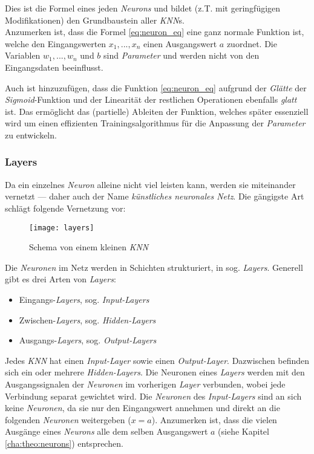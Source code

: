 Dies ist die Formel eines jeden \textit{Neurons} und bildet (z.T. mit geringfügigen Modifikationen) den Grundbaustein aller \textit{KNN}s.\\

Anzumerken ist, dass die Formel \ref{eq:neuron_eq} eine ganz normale Funktion ist, welche den Eingangswerten $x_1,...,x_n$ einen Ausgangswert $a$ zuordnet. Die Variablen $w_1,...,w_n$ und $b$ sind \textit{Parameter} und werden nicht von den Eingangsdaten beeinflusst.

Auch ist hinzuzufügen, dass die Funktion \ref{eq:neuron_eq} aufgrund der \textit{Glätte} der \textit{Sigmoid}-Funktion und der Linearität der restlichen Operationen ebenfalls \textit{glatt} ist. Das ermöglicht das (partielle) Ableiten der Funktion, welches später essenziell wird um einen effizienten Trainingsalgorithmus für die Anpassung der \textit{Parameter} zu entwickeln.

\newpage

\subsubsection{Layers}\label{cha:theo:layers}

Da ein einzelnes \textit{Neuron} alleine nicht viel leisten kann, werden sie miteinander vernetzt --- daher auch der Name \textit{künstliches neuronales Netz}. Die gängigste Art schlägt folgende Vernetzung vor:

\begin{figure}[h]
	\centering
	\texttt{[image: layers]}
	\caption[Schema von kleinem \textit{KNN}]{Schema von einem kleinen \textit{KNN}}
	\label{img:layers}
\end{figure}

Die \textit{Neuronen} im Netz werden in Schichten strukturiert, in sog. \textit{Layers}\footnotemark. Generell gibt es drei Arten von \textit{Layers}:


\begin{itemize}
	\item Eingangs-\textit{Layers}, sog. \textit{Input-Layers}
	\item Zwischen-\textit{Layers}, sog. \textit{Hidden-Layers}
	\item Ausgangs-\textit{Layers}, sog. \textit{Output-Layers}
\end{itemize}
Jedes \textit{KNN} hat einen \textit{Input-Layer} sowie einen \textit{Output-Layer}. Dazwischen befinden sich ein oder mehrere \textit{Hidden-Layers}. Die Neuronen eines \textit{Layers} werden mit den Ausgangssignalen der \textit{Neuronen} im vorherigen \textit{Layer} verbunden, wobei jede Verbindung separat gewichtet wird. Die \textit{Neuronen} des \textit{Input-Layers} sind an sich keine \textit{Neuronen}, da sie nur den Eingangswert annehmen und direkt an die folgenden \textit{Neuronen} weitergeben ($x = a$). Anzumerken ist, dass die vielen Ausgänge eines \textit{Neurons} alle dem selben Ausgangswert $a$ (siehe Kapitel \ref{cha:theo:neurons}) entsprechen. 

